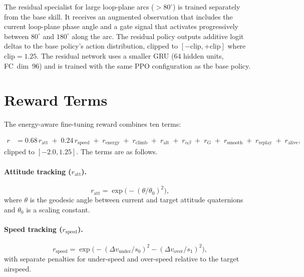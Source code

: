 \documentclass{article}
\begin{document}
The residual specialist for large loop-plane arcs ($> 80^\circ$) is
trained separately from the base skill.  It receives an augmented
observation that includes the current loop-plane phase angle and a gate
signal that activates progressively between $80^\circ$ and $180^\circ$
along the arc.  The residual policy outputs additive logit deltas to the
base policy's action distribution, clipped to
$[- \text{clip}, +\text{clip}]$ where $\text{clip} = 1.25$.  The
residual network uses a smaller GRU (64 hidden units, FC~dim~96) and is
trained with the same PPO configuration as the base policy.

\section{Reward Terms}
\label{app:rewards}

The energy-aware fine-tuning reward combines ten terms:

\begin{align}
  r &= 0.68\, r_{\mathrm{att}} \;+\; 0.24\, r_{\mathrm{speed}}
       \;+\; r_{\mathrm{energy}} \;+\; r_{\mathrm{climb}}
       \;+\; r_{\mathrm{alt}} \;+\; r_{\alpha\beta}
       \;+\; r_{G} \;+\; r_{\mathrm{smooth}} \;+\; r_{\mathrm{replay}}
       \;+\; r_{\mathrm{alive}} ,
\end{align}
clipped to $[-2.0, 1.25]$.  The terms are as follows.

\paragraph{Attitude tracking ($r_{\mathrm{att}}$).}
\begin{equation}
  r_{\mathrm{att}} = \exp\!\bigl(-(\theta / \theta_0)^2\bigr),
\end{equation}
where $\theta$ is the geodesic angle between current and target attitude
quaternions and $\theta_0$ is a scaling constant.

\paragraph{Speed tracking ($r_{\mathrm{speed}}$).}
\begin{equation}
  r_{\mathrm{speed}} = \exp\!\bigl(-(\Delta v_{\mathrm{under}} / s_0)^2
                         - (\Delta v_{\mathrm{over}} / s_1)^2\bigr),
\end{equation}
with separate penalties for under-speed and over-speed relative to the
target airspeed.
\end{document}
